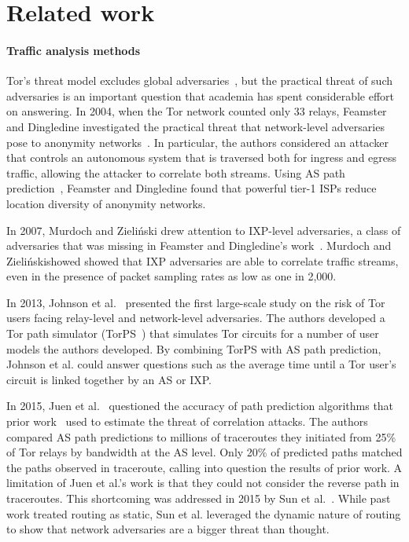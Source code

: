 \section{Related work}
\label{sec:related_work}

\paragraph{Traffic analysis methods}
Tor's threat model excludes global adversaries~\cite{Dingledine2004a}, but the
practical threat of such adversaries is an important question that academia has
spent considerable effort on answering.  In 2004, when the Tor network counted
only 33 relays, Feamster and Dingledine investigated the practical threat that
network-level adversaries pose to anonymity networks~\cite{Feamster2004a}.  In
particular, the authors considered an attacker that controls an autonomous
system that is traversed both for ingress and egress traffic, allowing the
attacker to correlate both streams.  Using AS path prediction~\cite{Gao2001a},
Feamster and Dingledine found that powerful tier-1 ISPs reduce location
diversity of anonymity networks.

In 2007, Murdoch and Zieli\'{n}ski drew attention to IXP-level adversaries, a
class of adversaries that was missing in Feamster and Dingledine's
work~\cite{Murdoch2007a}.  Murdoch and Zieli\'{n}skishowed showed that IXP
adversaries are able to correlate traffic streams, even in the presence of
packet sampling rates as low as one in 2,000.

In 2013, Johnson et al.~\cite{Johnson2013a} presented the first large-scale
study on the risk of Tor users facing relay-level and network-level
adversaries.  The authors developed a Tor path simulator (TorPS~\cite{TorPS})
that simulates Tor circuits for a number of user models the authors developed.
By combining TorPS with AS path prediction, Johnson et al. could answer
questions such as the average time until a Tor user's circuit is linked
together by an AS or IXP.

In 2015, Juen et al.~\cite{Juen2015a} questioned the accuracy of path
prediction algorithms that prior work~\cite{Johnson2013a,Feamster2004a} used to
estimate the threat of correlation attacks.  The authors compared AS path
predictions to millions of traceroutes they initiated from 25\% of Tor relays
by bandwidth at the AS level.  Only 20\% of predicted paths matched the paths
observed in traceroute, calling into question the results of prior work.  A
limitation of Juen et al.'s work is that they could not consider the reverse
path in traceroutes.  This shortcoming was addressed in 2015 by Sun et
al.~\cite{Sun2015a}.  While past work treated routing as static, Sun et al.
leveraged the dynamic nature of routing to show that network adversaries are a
bigger threat than thought.

